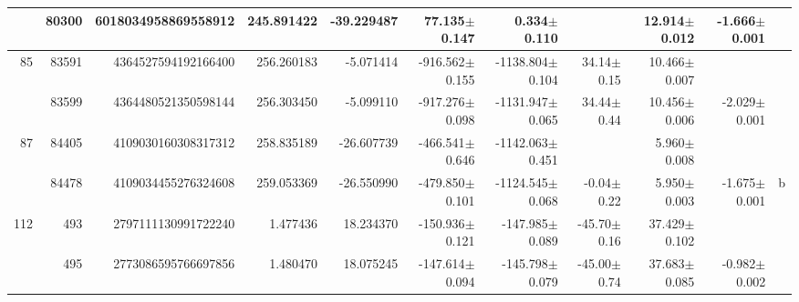 \documentclass{ws-ijmpd}
\begin{document}
\begin{landscape}
\begin{longtable}{rrrrrrrrrrl}
            &   80300 &      6018034958869558912 &                   245.891422 &                   -39.229487 &                 77.135$\pm$0.147 &                  0.334$\pm$0.110 &                           &        12.914$\pm$0.012 &                          -1.666$\pm$0.001 &                                                    \\
  \hline 85 &   83591 &      4364527594192166400 &                   256.260183 &                    -5.071414 &               -916.562$\pm$0.155 &              -1138.804$\pm$0.104 &          34.14$\pm$  0.15 &        10.466$\pm$0.007 &                                           &                                                    \\
            &   83599 &      4364480521350598144 &                   256.303450 &                    -5.099110 &               -917.276$\pm$0.098 &              -1131.947$\pm$0.065 &          34.44$\pm$  0.44 &        10.456$\pm$0.006 &                          -2.029$\pm$0.001 &                                                    \\
  \hline 87 &   84405 &      4109030160308317312 &                   258.835189 &                   -26.607739 &               -466.541$\pm$0.646 &              -1142.063$\pm$0.451 &                           &         5.960$\pm$0.008 &                                           &                                                    \\
            &   84478 &      4109034455276324608 &                   259.053369 &                   -26.550990 &               -479.850$\pm$0.101 &              -1124.545$\pm$0.068 &          -0.04$\pm$  0.22 &         5.950$\pm$0.003 &                          -1.675$\pm$0.001 &                                                  b \\
 \hline 112 &     493 &      2797111130991722240 &                     1.477436 &                    18.234370 &               -150.936$\pm$0.121 &               -147.985$\pm$0.089 &         -45.70$\pm$  0.16 &        37.429$\pm$0.102 &                                           &                                                    \\
            &     495 &      2773086595766697856 &                     1.480470 &                    18.075245 &               -147.614$\pm$0.094 &               -145.798$\pm$0.079 &         -45.00$\pm$  0.74 &        37.683$\pm$0.085 &                          -0.982$\pm$0.002 &                                                    \\

\end{longtable}
\end{landscape}
\end{document}
